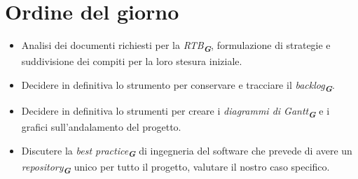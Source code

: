 

\section{Ordine del giorno}

\begin{itemize}
    \item Analisi dei documenti richiesti per la \emph{RTB}\textsubscript{\textit{\textbf{G}}}, formulazione di strategie e suddivisione dei compiti per
    la loro stesura iniziale.
    \item Decidere in definitiva lo strumento per conservare e tracciare il \emph{backlog}\textsubscript{\textit{\textbf{G}}}.
    \item Decidere in definitiva lo strumenti per creare i \emph{diagrammi di Gantt}\textsubscript{\textit{\textbf{G}}} e i grafici sull'andalamento del 
    progetto.
    \item Discutere la \emph{best practice}\textsubscript{\textit{\textbf{G}}} di ingegneria del software che prevede di avere un 
    \emph{repository}\textsubscript{\textit{\textbf{G}}} unico per tutto il progetto, valutare il nostro caso specifico.
\end{itemize}
